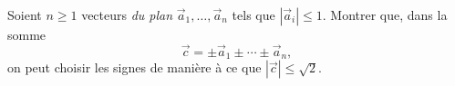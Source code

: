 Soient $n \geq 1$ vecteurs \emph{du plan} $\vec{a}_1, \ldots, \vec{a}_n$ tels
que $|\vec{a}_i| \leq 1$. Montrer que, dans la somme
\[
\vec{c} = \pm\vec{a}_1 \pm \cdots \pm \vec{a}_n,
\]
on peut choisir les signes de manière à ce que $|\vec{c}| \leq \sqrt{2}$.
